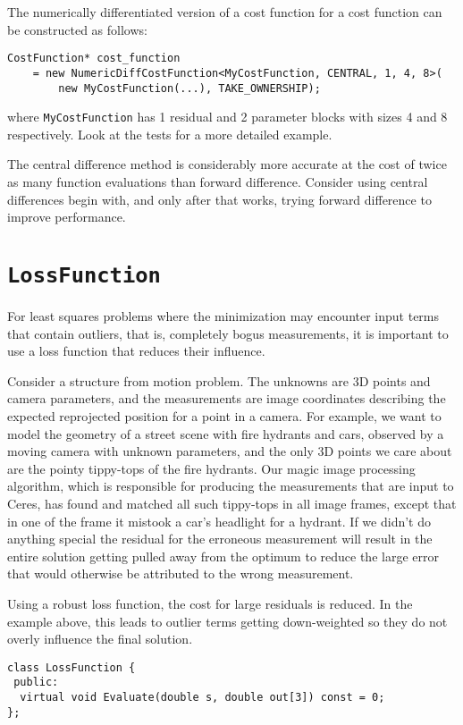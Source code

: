 The numerically differentiated version of a cost function for a cost function
can be constructed as follows:
\begin{verbatim}
CostFunction* cost_function
    = new NumericDiffCostFunction<MyCostFunction, CENTRAL, 1, 4, 8>(
        new MyCostFunction(...), TAKE_OWNERSHIP);
\end{verbatim}
where \texttt{MyCostFunction} has 1 residual and 2 parameter blocks with sizes 4 and 8
respectively. Look at the tests for a more detailed example.

The central difference method is considerably more accurate at the cost of
twice as many function evaluations than forward difference. Consider using
central differences begin with, and only after that works, trying forward
difference to improve performance.

\section{\texttt{LossFunction}}
 For least squares problems where the minimization may encounter
 input terms that contain outliers, that is, completely bogus
 measurements, it is important to use a loss function that reduces
 their influence.

 Consider a structure from motion problem. The unknowns are 3D
 points and camera parameters, and the measurements are image
 coordinates describing the expected reprojected position for a
 point in a camera. For example, we want to model the geometry of a
 street scene with fire hydrants and cars, observed by a moving
 camera with unknown parameters, and the only 3D points we care
 about are the pointy tippy-tops of the fire hydrants. Our magic
 image processing algorithm, which is responsible for producing the
 measurements that are input to Ceres, has found and matched all
 such tippy-tops in all image frames, except that in one of the
 frame it mistook a car's headlight for a hydrant. If we didn't do
 anything special  the
 residual for the erroneous measurement will result in the
 entire solution getting pulled away from the optimum to reduce
 the large error that would otherwise be attributed to the wrong
 measurement.

 Using a robust loss function, the cost for large residuals is
 reduced. In the example above, this leads to outlier terms getting
 down-weighted so they do not overly influence the final solution.

\begin{verbatim}
class LossFunction {
 public:
  virtual void Evaluate(double s, double out[3]) const = 0;
};
\end{verbatim}	

